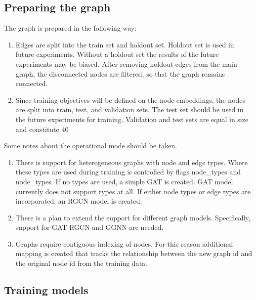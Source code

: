 \documentclass[a4paper,twoside]{article}
\begin{document}
\subsection{Preparing the graph}
The graph is prepared in the following way:
\begin{enumerate}
    \item Edges are split into the train set and holdout set. Holdout set is used in future experiments. Without a holdout set the results of the future experiments may be biased. After removing holdout edges from the main graph, the disconnected nodes are filtered, so that the graph remains connected.
    \item Since training objectives will be defined on the node embeddings, the nodes are split into train, test, and validation sets. The test set should be used in the future experiments for training. Validation and test sets are equal in size and constitute 40%
\end{enumerate}

Some notes about the operational mode should be taken. 
\begin{enumerate}
    \item There is support for heterogeneous graphs with node and edge types. Where these types are used during training is controlled by flags node\_types and node\_types. If no types are used, a simple GAT is created. GAT model currently does not support types at all. If either node types or edge types are incorporated, an RGCN model is created. 
    \item There is a plan to extend the support for different graph models. Specifically, support for  GAT RGCN and GGNN are needed. 
    \item Graphs require contiguous indexing of nodes. For this reason additional mapping is created that tracks the relationship between the new graph id and the original node id from the training data.
\end{enumerate}

\subsection{Training models}
\end{document}
